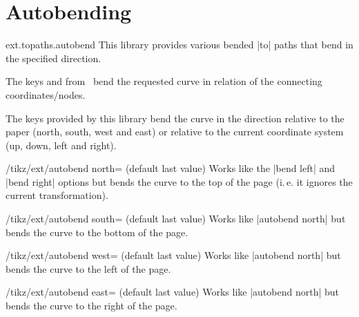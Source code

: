 %
%
%

\section{Autobending}
\label{library:topaths.autobend}
\begin{tikzlibrary}{ext.topaths.autobend}
  This library provides various bended |to| paths
  that bend in the specified direction.
  
\end{tikzlibrary}

The keys 
and  from \tikzname\ 
bend the requested curve in relation of the connecting
coordinates/nodes.

The keys provided by this library bend the curve in the direction relative
to the paper (north, south, west and east) or relative to the current
coordinate system (up, down, left and right).

\begin{key}{/tikz/ext/autobend north= (default \normalfont last value)}
  Works like the |bend left| and |bend right| options
  but bends the curve to the top of the page (i.\,e. it ignores the current transformation).
\end{key}
\begin{key}{/tikz/ext/autobend south= (default \normalfont last value)}
  Works like |autobend north| but bends the curve to the bottom of the page.
\end{key}
\begin{key}{/tikz/ext/autobend west= (default \normalfont last value)}
  Works like |autobend north| but bends the curve to the left of the page.
\end{key}
\begin{key}{/tikz/ext/autobend east= (default \normalfont last value)}
  Works like |autobend north| but bends the curve to the right of the page.
\end{key}

